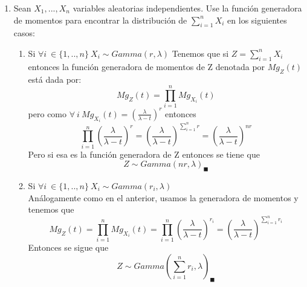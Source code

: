 \documentclass[11pt,a4paper]{report}
\begin{document}
\begin{enumerate}
		\item{
			Sean $X_{1},...,X_{n}$ variables aleatorias independientes. Use la función generadora de momentos para encontrar la distribución de $\sum_{i=1}^{n}X_{i}$ en los siguientes casos:\\
			\begin{enumerate}
			    \item {Si $\forall i \ \in \lbrace 1,..,n \rbrace \ X_{i} \sim Gamma(r,\lambda)$}
	        Tenemos que si $Z=\sum_{i=1}^{n}X_{i}$ entonces la función generadora de momentos de Z denotada por $Mg_{Z}(t)$ está dada por:
	        $$Mg_{Z}(t)=\prod_{i=1}^{n} Mg_{X_{i}}(t)$$ pero como $\forall \ i \ Mg_{X_{i}}(t)=(\frac{\lambda}{\lambda-t})^{r}$ entonces
	        $$\prod_{i=1}^{n}(\frac{\lambda}{\lambda-t})^{r}=(\frac{\lambda}{\lambda-t})^{\sum_{i=1}^{n}r}=(\frac{\lambda}{\lambda-t})^{nr}$$
	        Pero si esa es la función generadora de Z entonces se tiene que $$Z \sim Gamma(nr,\lambda)_{\blacksquare}$$
			    \item{Si $\forall i \ \in \lbrace 1,..,n \rbrace \ X_{i} \sim Gamma(r_{i},\lambda)$ } \\
			    Análogamente como en el anterior, usamos la generadora de momentos y tenemos que
			    $$Mg_{Z}(t)=\prod_{i=1}^{n}Mg_{X_{i}}(t)=\prod_{i=1}^{n}(\frac{\lambda}{\lambda-t})^{r_{i}}=(\frac{\lambda}{\lambda-t})^{\sum_{i=1}^{n}r_{i}}$$
			    Entonces se sigue que $$Z\sim Gamma(\sum_{i=1}^{n}r_{i},\lambda)_{\blacksquare}$$
			   

\end{enumerate}}
\end{enumerate}
\end{document}
